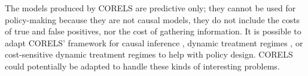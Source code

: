 The models produced by CORELS are predictive only; they cannot be used for policy-making because they are not causal models, they do not include the costs of true and false positives, nor the cost of gathering information. It is possible to adapt CORELS' framework for causal inference \citep{WangRu15CFRL}, dynamic treatment regimes \citep{ZhangEtAl15}, or cost-sensitive dynamic treatment regimes \citep{LakkarajuRu17} to help with policy design.  CORELS could potentially be adapted to handle these kinds of interesting problems. 
